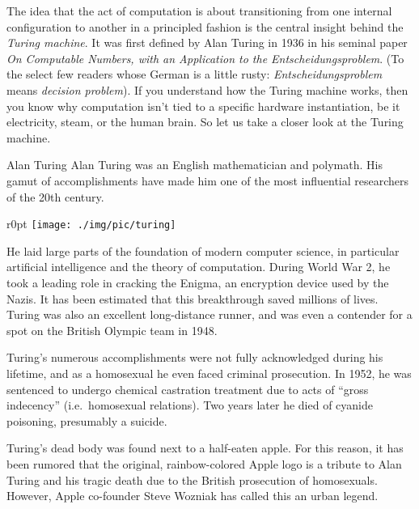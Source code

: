 The idea that the act of computation is about transitioning from one internal configuration to another in a principled fashion is the central insight behind the \emph{Turing machine}.
It was first defined by Alan Turing in 1936 in his seminal paper \emph{On Computable Numbers, with an Application to the Entscheidungsproblem}.
(To the select few readers whose German is a little rusty: \emph{Entscheidungsproblem} means \emph{decision problem}).
If you understand how the Turing machine works, then you know why computation isn't tied to a specific hardware instantiation, be it electricity, steam, or the human brain.
So let us take a closer look at the Turing machine.

\begin{person}[1912--1954]{Alan Turing}
Alan Turing was an English mathematician and polymath.
His gamut of accomplishments have made him one of the most influential researchers of the 20th century.
\begin{wrapfigure}{r}{0pt}
    \texttt{[image: ./img/pic/turing]}
\end{wrapfigure}
He laid large parts of the foundation of modern computer science, in particular artificial intelligence and the theory of computation.
During World War 2, he took a leading role in cracking the Enigma, an encryption device used by the Nazis.
It has been estimated that this breakthrough saved millions of lives.
Turing was also an excellent long-distance runner, and was even a contender for a spot on the British Olympic team in 1948.

Turing's numerous accomplishments were not fully acknowledged during his lifetime, and as a homosexual he even faced criminal prosecution.
In 1952, he was sentenced to undergo chemical castration treatment due to acts of ``gross indecency'' (i.e.~homosexual relations).
Two years later he died of cyanide poisoning, presumably a suicide.

Turing's dead body was found next to a half-eaten apple.
For this reason, it has been rumored that the original, rainbow-colored Apple logo is a tribute to Alan Turing and his tragic death due to the British prosecution of homosexuals.
However, Apple co-founder Steve Wozniak has called this an urban legend.
\end{person}

